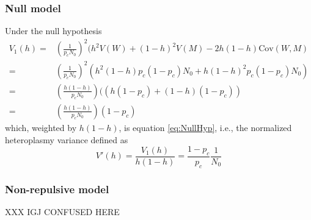 \documentclass{article}
\begin{document}
\begin{appendices}
\subsubsection*{Null model}\label{app:derivations}
Under the null hypothesis
\begin{equation*}
    \begin{split}
 V_1(h) = & \left(\frac{1}{p_cN_0}\right)^2(h^2V(W)+(1-h)^2V(M)
            -2h(1-h)\mathrm{Cov}(W,M)\\
        = & \left(\frac{1}{p_cN_0}\right)^2(h^2(1-h)p_c(1-p_c)N_0
            +h(1-h)^2p_c(1-p_c)N_0)\\
        = & \left(\frac{h(1-h)}{p_cN_0}\right)((h(1-p_c)+(1-h)(1-p_c))\\
        = & \left(\frac{h(1-h)}{p_cN_0}\right)(1-p_c)
    \end{split}
\end{equation*}
which, weighted by $h(1-h)$, is equation \ref{eq:NullHyp}, i.e., the normalized heteroplasmy variance defined as
\begin{equation}\label{eq:app-1-null-hypothesis-vh}
V'(h)=\frac{V_1(h)}{h(1-h)}=\frac{1-p_c}{p_c}\frac{1}{N_0}
\end{equation}



\subsubsection*{Non-repulsive model}
XXX IGJ CONFUSED HERE


\end{appendices}
\end{document}
